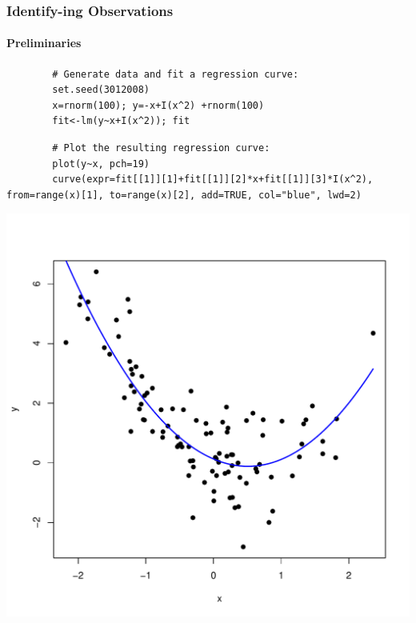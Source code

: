 

\begin{frame}
\frametitle{\ttfamily Identify\normalfont-ing Observations}
\framesubtitle{Preliminaries}
	\begin{lstlisting}
		# Generate data and fit a regression curve:
		set.seed(3012008)
		x=rnorm(100); y=-x+I(x^2) +rnorm(100)
		fit<-lm(y~x+I(x^2)); fit
	\end{lstlisting}

\begin{center}
\end{center}
\normalsize

	\begin{lstlisting}
		# Plot the resulting regression curve:
		plot(y~x, pch=19)
		curve(expr=fit[[1]][1]+fit[[1]][2]*x+fit[[1]][3]*I(x^2), from=range(x)[1], to=range(x)[2], add=TRUE, col="blue", lwd=2)
	\end{lstlisting}

\newpage
\begin{center}
\includegraphics[scale=0.35]{images/xyPlot.pdf}
\end{center}

\end{frame}

